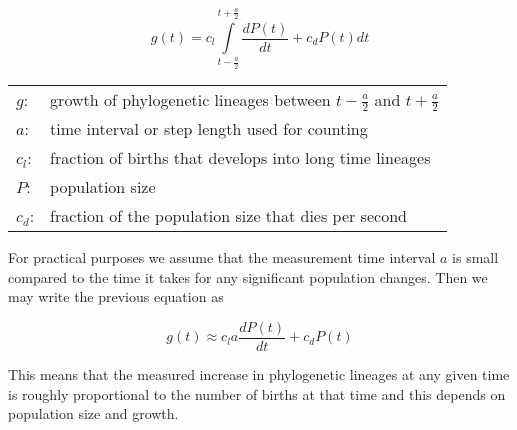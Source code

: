 \begin{equation}
g(t) = c_l \int\limits_{t-\frac{a}{2}}^{t+\frac{a}{2}} \frac{dP(t)}{dt} + c_{d} P(t) dt
\end{equation}

\begin{tabular}{ll}
$g$:     & growth of phylogenetic lineages between $t-\frac{a}{2}$ and $t+\frac{a}{2}$\\
$a$:     & time interval or step length used for counting\\
$c_l$:   & fraction of births that develops into long time lineages\\
$P$:     & population size\\
$c_{d}$: & fraction of the population size that dies per second
\end{tabular}
\vspace{1em}

For practical purposes we assume that the measurement time
interval $a$ is small compared to the time it takes for any
significant population changes. Then we may write the previous
equation as

\begin{equation}
g(t) \approx c_l a \frac{dP(t)}{dt} + c_{d} P(t)
\end{equation}

This means that the measured increase in phylogenetic lineages
at any given time is roughly proportional to the number of births
at that time and this depends on population size and growth.







